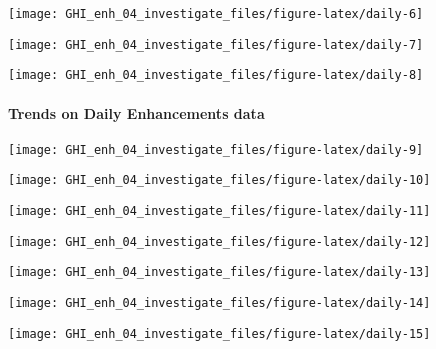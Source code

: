 \documentclass[
  10pt,
  a4paper,oneside]{article}
\begin{document}
\begin{center}\texttt{[image: GHI\_enh\_04\_investigate\_files/figure-latex/daily-6]} \end{center}

\begin{center}\texttt{[image: GHI\_enh\_04\_investigate\_files/figure-latex/daily-7]} \end{center}

\begin{center}\texttt{[image: GHI\_enh\_04\_investigate\_files/figure-latex/daily-8]} \end{center}

\newpage

\hypertarget{trends-on-daily-enhancements-data}{%
\paragraph{Trends on Daily Enhancements data}\label{trends-on-daily-enhancements-data}}

\begin{center}\texttt{[image: GHI\_enh\_04\_investigate\_files/figure-latex/daily-9]} \end{center}

\begin{center}\texttt{[image: GHI\_enh\_04\_investigate\_files/figure-latex/daily-10]} \end{center}

\begin{center}\texttt{[image: GHI\_enh\_04\_investigate\_files/figure-latex/daily-11]} \end{center}

\begin{center}\texttt{[image: GHI\_enh\_04\_investigate\_files/figure-latex/daily-12]} \end{center}

\begin{center}\texttt{[image: GHI\_enh\_04\_investigate\_files/figure-latex/daily-13]} \end{center}

\begin{center}\texttt{[image: GHI\_enh\_04\_investigate\_files/figure-latex/daily-14]} \end{center}

\begin{center}\texttt{[image: GHI\_enh\_04\_investigate\_files/figure-latex/daily-15]} \end{center}
\end{document}
